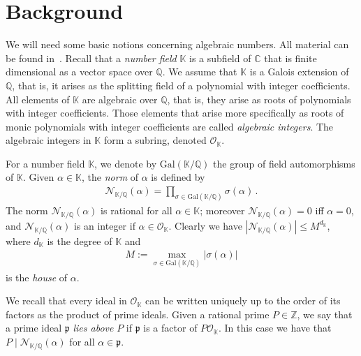 \documentclass[preprint,12pt]{elsarticle}
\begin{document}
\section{Background}
  We will need some basic notions concerning algebraic numbers.  All
  material can be found in~\cite{FrohlichTaylor1993}.  Recall that a \emph{number field}
  $\mathbb{K}$ is a subfield of $\mathbb{C}$ that is finite
  dimensional as a vector space over $\mathbb{Q}$.  We assume that
  $\mathbb K$ is a Galois extension of $\mathbb Q$, that is, it arises
  as the splitting field of a polynomial with integer coefficients.
  All elements of $\mathbb K$ are algebraic over $\mathbb Q$, that is,
  they arise as roots of polynomials with integer coefficients.  Those
  elements that arise more specifically as roots of monic polynomials
  with integer coefficients are called \emph{algebraic integers}.  The
  algebraic integers in $\mathbb{K}$ form a subring, denoted
  $\mathcal{O}_{\mathbb{K}}$.

For a number field $\mathbb{K}$, we denote by
$\mathrm{Gal}(\mathbb{K}/\mathbb{Q})$ the group of field automorphisms
of $\mathbb{K}$.  Given $\alpha \in \mathbb{K}$, the \emph{norm} of
$\alpha$ is defined by
\begin{gather*}
\mathcal{N}_{\mathbb{K}/\mathbb{Q}}(\alpha) = \!\!\!\!\! \prod_{\sigma \in 
  \mathrm{Gal}(\mathbb{K}/\mathbb{Q})} \!\!\! \!\!\! \sigma(\alpha) \, .
\end{gather*}
The norm $\mathcal{N}_{\mathbb{K}/\mathbb{Q}}(\alpha)$ is rational for all 
$\alpha\in\mathbb{K}$; moreover $\mathcal{N}_{\mathbb{K}/\mathbb{Q}}(\alpha) =
0$ iff $\alpha =0$, and
$\mathcal{N}_{\mathbb{K}/\mathbb{Q}}(\alpha)$ is 
an integer if $\alpha \in \mathcal{O}_{\mathbb{K}}$.  Clearly we have
$|\mathcal{N}_{\mathbb{K}/\mathbb{Q}}(\alpha)| \leq M^{d_{\mathbb{K}}}$, where
$d_{\mathbb{K}}$ is the degree of $\mathbb{K}$ and
\begin{gather*}
  M  := \!\!\! \max_{\sigma \in \mathrm{Gal}(\mathbb{K}/\mathbb{Q})}
  |\sigma(\alpha)|
\end{gather*}
is the \emph{house} of $\alpha$.

We recall that every ideal in $\mathcal{O}_{\mathbb{K}}$ can be
written uniquely up to the order of its factors as the product of
prime ideals.  Given a rational prime $P \in \mathbb{Z}$, we say that
a prime ideal $\mathfrak{p}$ \emph{lies above} $P$ if $\mathfrak{p}$ is a
factor of $P\mathcal{O}_{\mathbb{K}}$.  In this case we have that
$P \mid \mathcal{N}_{\mathbb{K}/\mathbb{Q}}(\alpha)$ for all
$\alpha \in \mathfrak{p}$.
\end{document}
